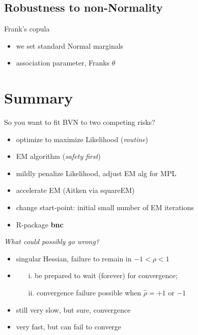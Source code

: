\documentclass{beamer}
\providecommand{\tightlist}{%
\setlength{\itemsep}{0pt}\setlength{\parskip}{0pt}}
\begin{document}
\subsection{Robustness to non-Normality}

\begin{frame}{}
\begin{exampleblock}{Frank's copula}
\begin{itemize}
    \item we set standard Normal marginals
    \item association parameter, Franks $\theta$
\end{itemize}
\end{exampleblock}
\end{frame}
\section*{Summary}

\begin{frame}[fragile]{So you want to fit BVN to two competing risks?}
\protect\hypertarget{so-you-want-to-fit-bvn-to-two-competing-risks}{}
\begin{itemize}
\tightlist
\item<1->
  optimize to maximize Likelihood (\emph{routine})
  \item<2-> EM algorithm (\emph{safety first}) 
  \item<3-> mildly
penalize Likelihood, adjust EM alg for MPL
  \item<4-> accelerate EM (Aitken via squareEM)
  \item<5-> change start-point: initial small number of
EM iterations 
  \item<6-> R-package \textbf{bnc}
\end{itemize}

\alert{\emph{What could possibly go wrong?}}
\begin{itemize}
\item<1> singular Hessian, failure to remain in $-1 < \rho < 1$ 
\item<2>
  \begin{enumerate}
  \item[i.] be prepared to wait (forever) for convergence;
  \item[ii.] convergence failure possible when $\hat{\rho} = +1$ or $-1$
  \end{enumerate}
\item<3> still very slow, but sure, convergence
\item<4> very fast, but can fail to converge
\end{itemize}
\end{frame}
\end{document}
